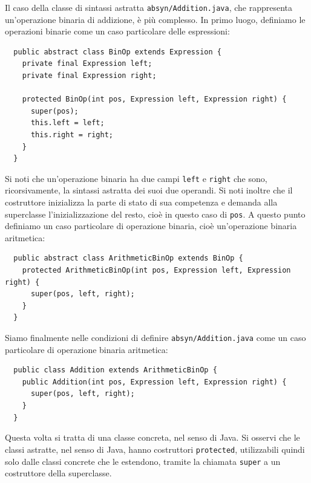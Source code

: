 Il caso della classe di sintassi astratta \texttt{absyn/Addition.java}, che
rappresenta un'operazione binaria di addizione, \`e
pi\`u complesso. In primo luogo, definiamo le operazioni binarie come un
caso particolare delle espressioni:
%
\begin{verbatim}
  public abstract class BinOp extends Expression {
    private final Expression left;
    private final Expression right;

    protected BinOp(int pos, Expression left, Expression right) {
      super(pos);
      this.left = left;
      this.right = right;
    }
  }
\end{verbatim}
%
Si noti che un'operazione binaria ha due campi \texttt{left} e \texttt{right}
che sono, ricorsivamente, la sintassi astratta dei suoi due operandi.
Si noti inoltre che il costruttore inizializza la parte di stato di sua
competenza e demanda alla superclasse l'inizializzazione del resto, cio\`e in
questo caso di \texttt{pos}.
A questo punto definiamo un caso particolare di operazione binaria,
cio\`e un'operazione binaria aritmetica:
%
\begin{verbatim}
  public abstract class ArithmeticBinOp extends BinOp {
    protected ArithmeticBinOp(int pos, Expression left, Expression right) {
      super(pos, left, right);
    }
  }
\end{verbatim}
%
Siamo finalmente nelle condizioni di definire \texttt{absyn/Addition.java}
come un caso particolare di operazione binaria aritmetica:
%
\begin{verbatim}
  public class Addition extends ArithmeticBinOp {
    public Addition(int pos, Expression left, Expression right) {
      super(pos, left, right);
    }
  }
\end{verbatim}
%
Questa volta si tratta di una classe concreta, nel senso di Java.
Si osservi che le classi
astratte, nel senso di Java, hanno costruttori \texttt{protected},
utilizzabili quindi solo dalle classi concrete che le estendono,
tramite la chiamata \texttt{super} a un costruttore della superclasse.


